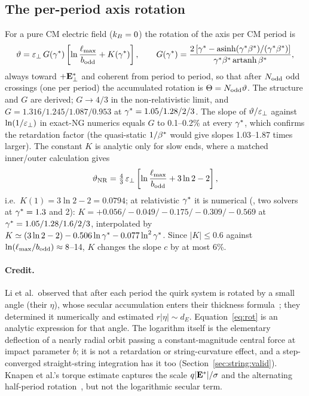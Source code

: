 \subsection{The per-period axis rotation}\label{sec:string:rot}
For a pure CM electric field ($k_B=0$) the rotation of the axis per CM period is
\begin{equation}
  \vartheta=\varepsilon_\perp\,G(\gamma^*)\left[\ln\frac{\ell_{\max}}{b_{\rm odd}}+K(\gamma^*)\right],\qquad
  G(\gamma^*)=\frac{2\left[\gamma^*-\operatorname{asinh}(\gamma^*\beta^*)/(\gamma^*\beta^*)\right]}{\gamma^*\beta^*\operatorname{artanh}\beta^*},
  \label{eq:rot}
\end{equation}
always toward $+\mathbf{E}^*_\perp$ and coherent from period to period, so that after $N_{\rm odd}$ odd crossings (one per period) the accumulated rotation is
$\Theta=N_{\rm odd}\vartheta$. The structure and $G$ are
derived; $G\to4/3$ in the non-relativistic limit, and $G=1.316/1.245/1.087/0.953$ at $\gamma^*=1.05/1.28/2/3$. The slope of
$\vartheta/\varepsilon_\perp$ against $\ln(1/\varepsilon_\perp)$ in exact-NG numerics equals $G$ to 0.1--0.2\% at every $\gamma^*$, which confirms the
retardation factor (the quasi-static $1/\beta^*$ would give slopes 1.03--1.87 times larger). The constant $K$ is analytic
only for slow ends, where a matched inner/outer calculation gives
\begin{equation}
  \vartheta_{\rm NR}=\tfrac43\,\varepsilon_\perp\left[\ln\frac{\ell_{\max}}{b_{\rm odd}}+3\ln2-2\right],
  \label{eq:rotNR}
\end{equation}
i.e.\ $K(1)=3\ln2-2=0.0794$; at relativistic $\gamma^*$ it is numerical (\EST{}, two solvers at $\gamma^*=1.3$ and 2):
$K=+0.056/-0.049/-0.175/-0.309/-0.569$ at $\gamma^*=1.05/1.28/1.6/2/3$, interpolated by
$K\simeq(3\ln2-2)-0.506\ln\gamma^*-0.077\ln^2\gamma^*$. Since $|K|\le0.6$ against $\ln(\ell_{\max}/b_{\rm odd})\approx8$--14, $K$ changes
the slope $c$ by at most 6\%.

\paragraph{Credit.} Li et al.\ observed that after each period the quirk system is rotated by a small angle (their
$\eta$), whose secular accumulation enters their thickness formula~\cite[Eqs.~(A.6), (A.17), (V.5)--(V.6),
(B.9)]{Li:2020aoq}; they determined it numerically and estimated $r|\eta|\sim d_E$. Equation~\eqref{eq:rot} is an
analytic expression for that angle. The logarithm itself is the elementary deflection of a nearly radial orbit passing a
constant-magnitude central force at impact parameter $b$; it is not a retardation or string-curvature effect, and a
step-converged straight-string integration has it too (Section~\ref{sec:string:valid}). Knapen et al.'s torque estimate
captures the scale $q|\mathbf{E}^*|/\sigma$ and the alternating half-period rotation~\cite[Eqs.~(8)--(9)]{Knapen:2017kly}, but
not the logarithmic secular term.

